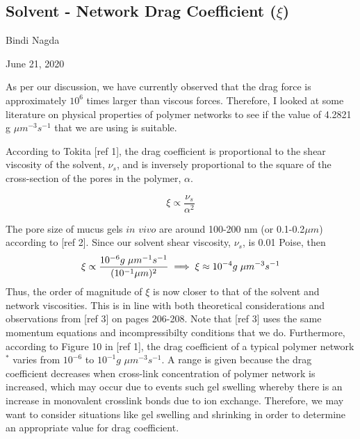 \documentclass[11pt,a4paper]{article}
\begin{document}
\begin{center}
\section{Solvent - Network Drag Coefficient ($\xi$)}
Bindi Nagda

\medskip 
June 21, 2020
\end{center}

\begin{flushleft}
\begin{justify}
As per our discussion, we have currently observed that the drag force is approximately $10^6$ times larger than viscous forces. Therefore, I looked at some literature on physical properties of polymer networks to see if the value of 4.2821 g $\mu m^{-3}s^{-1}$ that we are using is suitable.

\bigskip
\end{justify}

According to Tokita [ref 1], the drag coefficient is proportional to the shear viscosity of the solvent, $\nu_s$, and is inversely proportional to the square of the cross-section of the pores in the polymer, $\alpha$. 


$$\xi \propto \frac{\nu_s}{\alpha^2}$$

\begin{justify}
The pore size of mucus gels $\textit{in vivo}$ are around 100-200 nm (or 0.1-0.2$\mu m$) according to [ref 2]. Since our solvent shear viscosity, $\nu_s$, is 0.01 Poise, then $$ \xi \propto \dfrac{10^{-6} g \hspace{0.1cm} \mu m^{-1}s^{-1}}{(10^{-1}\mu m)^2} \implies \xi \approx 10^{-4}g \hspace{0.1cm} \mu m^{-3}s^{-1} $$ Thus, the order of magnitude of $\xi$ is now closer to that of the solvent and network viscosities. This is in line with both theoretical considerations and observations from [ref 3] on pages 206-208. Note that [ref 3] uses the same momentum equations and incompressibilty conditions that we do. Furthermore, according to Figure 10 in [ref 1], the drag coefficient of a typical polymer network$^*$ varies from $10^{-6}$ to $10^{-1} g$ $\mu m^{-3}s^{-1}$.  A range is given because the drag coefficient decreases when cross-link concentration of polymer network is increased, which may occur due to events such gel swelling whereby there is an increase in monovalent crosslink bonds due to ion exchange. Therefore, we may want to consider situations like gel swelling and shrinking in order to determine an appropriate value for drag coefficient. 


\end{justify}
\end{flushleft}
\end{document}
